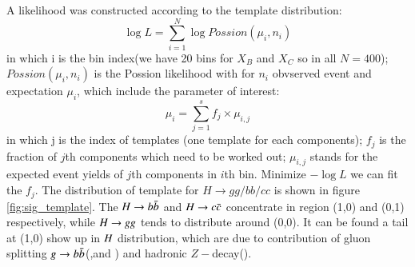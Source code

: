  A likelihood was constructed according to the template distribution:
 \begin{equation}
 \log{L} = \sum\limits_{i=1}^N{\log{Possion(\mu_{i},n_{i})}}
 \label{for:template}
 \end{equation}
in which i is the bin index(we have 20 bins for $X_B$ and $X_C$ so in all $N=400$); $Possion(\mu_{i},n_{i})$ is the Possion likelihood with for $n_{i}$ obvserved event and expectation $\mu_{i}$, which include the parameter of interest:
\begin{equation}
\mu_{i} = \sum\limits_{j=1}^s f_j\times\mu_{i,j}
\end{equation}
in which j is the index of templates (one template for each components); $f_j$ is the fraction of $j$th components which need to be worked out; $\mu_{i,j}$ stands for the expected event yields of $j$th components in $i$th bin. Minimize $-\log{L}$ we can fit the $f_j$. The distribution of template for $H\to gg/bb/cc$ is shown in figure \ref{fig:sig_template}. The $H \rightarrow b\bar{b}$ and $H \rightarrow c\bar{c}$ concentrate in region (1,0) and (0,1) respectively, while $H\rightarrow gg$ tends to distribute around (0,0). It can be found a tail at (1,0) show up in $H$ distribution, which are due to contribution of gluon splitting $g\rightarrow b\bar{b}$(\eeh,\mmh and \nnh) and hadronic $Z-$decay(\qqh).
 
